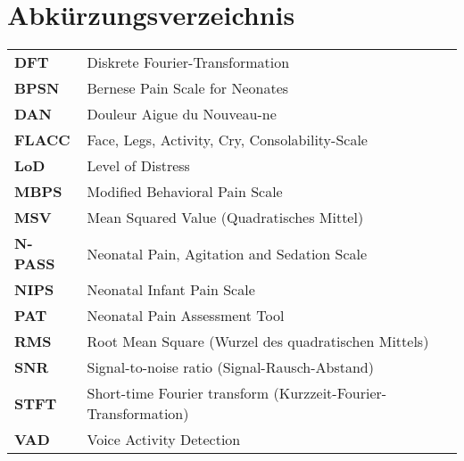 \chapter*{Abkürzungsverzeichnis}




\begin{table}[h]
\begin{tabular}{ll}
\textbf{DFT}    & Diskrete Fourier-Transformation                                \\
\textbf{BPSN}   & Bernese Pain Scale for Neonates                                \\
\textbf{DAN}    & Douleur Aigue du Nouveau-ne                                    \\
\textbf{FLACC}  & Face, Legs, Activity, Cry, Consolability-Scale                 \\
\textbf{LoD}    & Level of Distress                                              \\
\textbf{MBPS}   & Modified Behavioral Pain Scale                                 \\
\textbf{MSV}    & Mean Squared Value (Quadratisches Mittel)                      \\
\textbf{N-PASS} & Neonatal Pain, Agitation and Sedation Scale                    \\
\textbf{NIPS}   & Neonatal Infant Pain Scale                                     \\
\textbf{PAT}    & Neonatal Pain Assessment Tool                                  \\
\textbf{RMS}    & Root Mean Square (Wurzel des quadratischen Mittels)            \\
\textbf{SNR}    & Signal-to-noise ratio (Signal-Rausch-Abstand)                  \\
\textbf{STFT}   & Short-time Fourier transform (Kurzzeit-Fourier-Transformation) \\
\textbf{VAD}    & Voice Activity Detection  
\end{tabular}
\end{table}